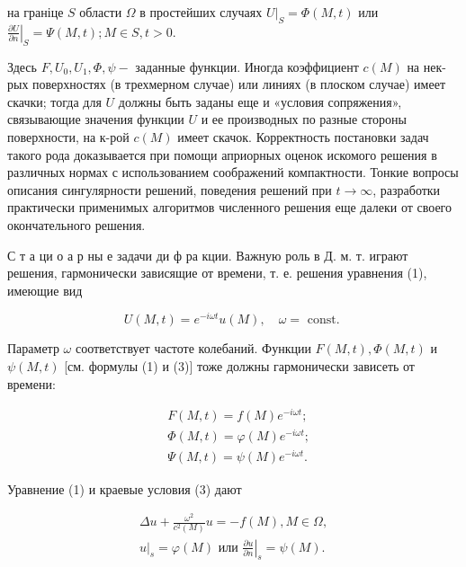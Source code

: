 \documentclass[10pt]{article}
\begin{document}
на граніце $S$ области $\Omega$ в простейших случаях $\left.U\right|_{S}=\Phi(M, t)$ или $\left.\frac{\partial U}{\partial n}\right|_{S}=\Psi(M, t) ; M \in S, t>0$.



Здесь $F, U_{0}, U_{1}, \Phi, \psi-$ заданные функции. Иногда коэффициент $c(M)$ на нек-рых поверхностях (в трехмерном случае) или линиях (в плоском случае) имеет скачки; тогда для $U$ должны быть заданы еще и «условия сопряжения», связывающие значения функции $U$ и ее производных по разные стороны поверхности, на к-рой $c(M)$ имеет скачок. Корректность постановки задач такого рода доказывается при помощи априорных оценок искомого решения в различных нормах с использованием соображений компактности. Тонкие вопросы описания сингулярности решений, поведения решений при $t \rightarrow \infty$, разработки практически применимых алгоритмов численного решения еще далеки от своего окончательного решения.



С т а ци о а р ны е задачи ди ф ра кции. Важную роль в Д. м. т. играют решения, гармонически зависящие от времени, т. е. решения уравнения (1), имеющие вид



\[

U(M, t)=e^{-i \omega t} u(M), \quad \omega=\text { const. }

\]



Параметр $\omega$ соответствует частоте колебаний. Функции $F(M, t), \Phi(M, t)$ и $\psi(M, t)$ [см. формулы (1) и (3)] тоже должны гармонически зависеть от времени:



\[

\begin{aligned}

& F(M, t)=f(M) e^{-i \omega t} ; \\

& \Phi(M, t)=\varphi(M) e^{-i \omega t} ; \\

& \Psi(M, t)=\psi(M) e^{-i \omega t} .

\end{aligned}

\]



Уравнение (1) и краевые условия (3) дают



\[

\begin{gathered}

\Delta u+\frac{\omega^{2}}{c^{2}(M)} u=-f(M), M \in \Omega, \\

\left.u\right|_{s}=\varphi(M) \text { или }\left.\frac{\partial u}{\partial n}\right|_{s}=\psi(M) .

\end{gathered}

\]
\end{document}
